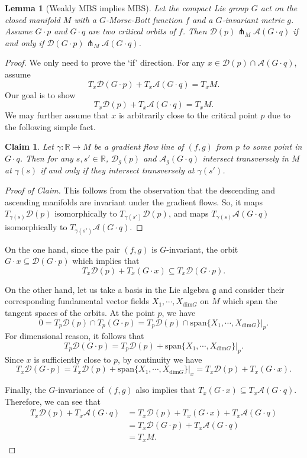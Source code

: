 \documentclass[11pt]{amsart}
\newtheorem{claim}[theorem]{Claim}
\newtheorem{lemma}[theorem]{Lemma}
\theoremstyle{definition}
\numberwithin{equation}{subsection}
\newcommand{\R}{\mathbb{R}}
\newcommand{\des}{\mathscr{D}}
\newcommand{\asc}{\mathscr{A}}
\newcommand{\g}{\mathfrak{g}}
\begin{document}
\begin{lemma}[Weakly MBS implies MBS]\label{lem:equivMBS}
    Let the compact Lie group $G$ act on the closed manifold $M$ with a $G$-Morse-Bott function $f$ and a $G$-invariant metric $g$. Assume $G\cdot p$ and $G\cdot q$ are two critical orbits of $f$. Then $\des(p)\pitchfork_M \asc(G\cdot q)$ if and only if $\des(G\cdot p)\pitchfork_M \asc(G\cdot q)$.
\end{lemma}
\begin{proof}
    We only need to prove the `if' direction. For any $x\in \des(p)\cap\asc(G\cdot q)$, assume \[T_x\des(G\cdot p)+T_x\asc(G\cdot q)=T_xM.\] Our goal is to show \[T_x\des(p)+T_x\asc(G\cdot q)=T_xM.\] We may further assume that $x$ is arbitrarily close to the critical point $p$ due to the following simple fact.
    \begin{claim}\label{claim:transverse}
   Let $\gamma: \R \to M$ be a gradient flow line of $(f,g)$ from $p$ to some point in $G\cdot q$. Then for any $s, s' \in \R$, $\des_{g}(p)$ and $\asc_{g}(G\cdot q)$ intersect transversely in $M$ at $\gamma(s)$ if and only if they  intersect transversely at $\gamma(s')$.
\end{claim}
\begin{proof}[Proof of Claim]
This follows from the observation that the descending and ascending manifolds are invariant under the gradient flows. So, it maps $T_{\gamma(s)} \des(p)$ isomorphically to $T_{\gamma(s')} \des(p)$, and maps $T_{\gamma(s)} \asc(G\cdot q)$ isomorphically to $T_{\gamma(s')} \asc(G\cdot q)$. 
\end{proof}

    
    On the one hand, since the pair $(f,g)$ is $G$-invariant, the orbit $G\cdot x\subseteq\des(G\cdot p)$ which implies that 
    \[T_x\des(p)+T_x(G\cdot x)\subseteq T_x\des(G\cdot p).\]
    
    On the other hand, let us take a basis in the Lie algebra  $\g$ and consider their corresponding fundamental vector fields $X_1,\cdots,X_{\text{dim}G}$ on $M$ which span the tangent spaces of the orbits. At the point $p$, we have\[0=T_p\des(p)\cap T_p(G\cdot p)=T_p\des(p)\cap \text{span}\{X_1,\cdots,X_{\text{dim}G}\}|_p.\] For dimensional reason, it follows that \[T_p\des(G\cdot p)=T_p\des(p)+\text{span}\{X_1,\cdots,X_{\text{dim}G}\}|_p.\] Since $x$ is sufficiently close to $p$, by continuity we have \[T_x\des(G\cdot p)=T_x\des(p)+\text{span}\{X_1,\cdots,X_{\text{dim}G}\}|_x=T_x\des(p)+ T_x (G\cdot x).\] 
    
    Finally, the $G$-invariance of $(f,g)$ also implies that $T_x(G\cdot x)\subseteq T_x\asc(G\cdot q)$. Therefore, we can see that 
    \begin{align*}
        T_x\des(p)+T_x\asc(G\cdot q)&= T_x\des(p)+T_x(G\cdot x)+T_x\asc(G\cdot q)\\
        &=T_x\des(G\cdot p)+T_x\asc(G\cdot q)\\
        &=T_xM.
    \end{align*}
\end{proof}
\end{document}
